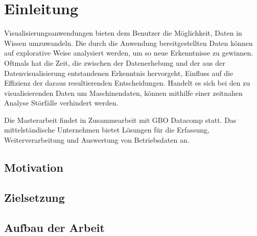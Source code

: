 \chapter{Einleitung}
\label{chap:einleitung}
Visualisierungsanwendungen bieten dem Benutzer die Möglichkeit,
Daten in Wissen umzuwandeln. Die durch die Anwendung bereitgestellten
Daten können auf explorative Weise analysiert werden, um so neue
Erkenntnisse zu gewinnen. Oftmals hat die Zeit, die zwischen der 
Datenerhebung und der aus der Datenvisualisierung entstandenen Erkenntnis
hervorgeht, Einfluss auf die Effizienz der daraus resultierenden Entscheidungen.
Handelt es sich bei den zu visualisierenden Daten um Maschinendaten,
können mithilfe einer zeitnahen Analyse Störfälle verhindert werden.

Die Masterarbeit findet in Zusammearbeit mit GBO Datacomp statt.
Das mittelständische Unternehmen bietet Lösungen für die Erfassung,
Weiterverarbeitung und Auswertung von Betriebsdaten an. 



\section{Motivation}
\label{sec:motivation}


\section{Zielsetzung}
\label{sec:zielsetzung}

\section{Aufbau der Arbeit}
\label{sec:aufbauderarbeit}




